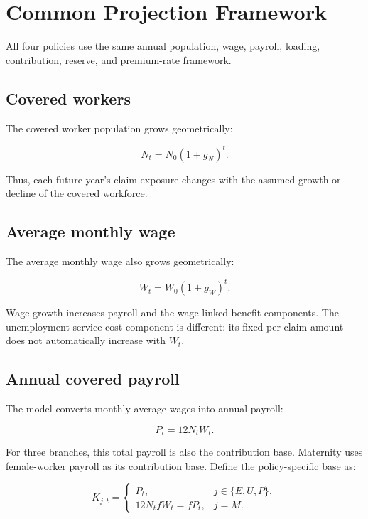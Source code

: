 \section{Common Projection Framework}

All four policies use the same annual population, wage, payroll, loading, contribution, reserve, and premium-rate framework.

\subsection{Covered workers}

The covered worker population grows geometrically:

\begin{equation}
N_t=N_0(1+g_N)^t.
\end{equation}

Thus, each future year's claim exposure changes with the assumed growth or decline of the covered workforce.

\subsection{Average monthly wage}

The average monthly wage also grows geometrically:

\begin{equation}
W_t=W_0(1+g_W)^t.
\end{equation}

Wage growth increases payroll and the wage-linked benefit components. The unemployment service-cost component is different: its fixed per-claim amount does not automatically increase with $W_t$.

\subsection{Annual covered payroll}

The model converts monthly average wages into annual payroll:

\begin{equation}
P_t=12N_tW_t.
\end{equation}

For three branches, this total payroll is also the contribution base. Maternity uses female-worker payroll as its contribution base. Define the policy-specific base as:

\begin{equation}
K_{j,t}=\begin{cases}
P_t, & j\in\{E,U,P\},\\
12N_tfW_t=fP_t, & j=M.
\end{cases}
\end{equation}


